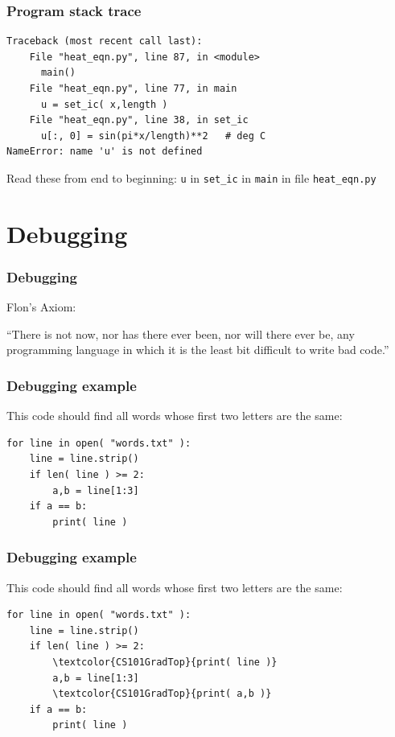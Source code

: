 \documentclass[11pt]{beamer}
\begin{document}
\begin{frame}[fragile]
  \frametitle{Program stack trace}

  \begin{Verbatim}
Traceback (most recent call last):
    File "heat_eqn.py", line 87, in <module>
      main()
    File "heat_eqn.py", line 77, in main
      u = set_ic( x,length )
    File "heat_eqn.py", line 38, in set_ic
      u[:, 0] = sin(pi*x/length)**2   # deg C
NameError: name 'u' is not defined
  \end{Verbatim}
  \begin{enumerate}
  \myitem  Read these from end to beginning:
  \mysubitem  \texttt{u} in \texttt{set\_ic} in \texttt{main} in file \texttt{heat\_eqn.py}
  \end{enumerate}
\end{frame}

\section{Debugging}

\begin{frame}[fragile]
  \frametitle{Debugging}
  \Enlarge

Flon's Axiom:

``There is not now, nor has there ever been, nor will there ever be, any programming language in which it is the least bit difficult to write bad code.''
\end{frame}

\begin{frame}[fragile]
  \frametitle{Debugging example}

  This code should find all words whose first two letters are the same:
  \begin{Verbatim}[commandchars=\\\{\},commentchar=\%]
for line in open( "words.txt" ):
    line = line.strip()
    if len( line ) >= 2:
        a,b = line[1:3]
    if a == b:
        print( line )
  \end{Verbatim}
\end{frame}

\begin{frame}[fragile]
  \frametitle{Debugging example}

  This code should find all words whose first two letters are the same:
  \begin{Verbatim}[commandchars=\\\{\},commentchar=\%]
for line in open( "words.txt" ):
    line = line.strip()
    if len( line ) >= 2:
        \textcolor{CS101GradTop}{print( line )}
        a,b = line[1:3]
        \textcolor{CS101GradTop}{print( a,b )}
    if a == b:
        print( line )
  \end{Verbatim}
\end{frame}
\end{document}
